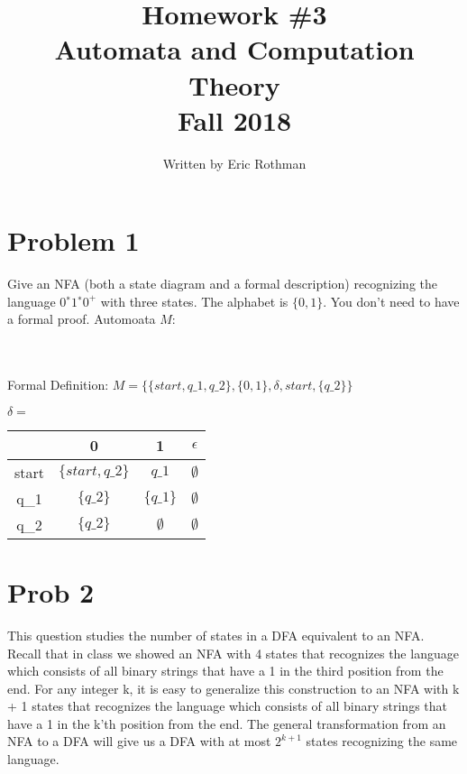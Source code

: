 \documentclass[letterpaper, 11pt]{article}
\begin{document}
\title{Homework \#3 \\ Automata and Computation Theory \\Fall 2018}
\author{Written by Eric Rothman}

\maketitle

\section{Problem 1}
 Give an NFA (both a state diagram and a formal description) recognizing the language $0^∗1^∗0^+$ with three states. The alphabet is $\{0, 1\}$. You don’t need to have a formal proof.
Automoata $M$:

\\\\
Formal Definition:
$M = \{\{start, q\_1, q\_2\}, \{0, 1\}, \delta, start, \{q\_2\}\}$

$\delta = $
\begin{tabular}{|c|c|c|c|}
  \hline
   & 0 & 1 & $\epsilon$\\
  \hline
  start & $\{start, q\_2\}$ & ${q\_1}$ & $\emptyset$\\
  \hline
  q\_1 & $\{q\_2\}$ & $\{q\_1\}$ & $\emptyset$\\
  \hline
  q\_2 & $\{q\_2\}$ & $\emptyset$ & $\emptyset$\\
  \hline
\end{tabular}

\newpage
\section{Prob 2}

This question studies the number of states in a DFA equivalent to an NFA. Recall that
in class we showed an NFA with 4 states that recognizes the language which consists of all binary
strings that have a 1 in the third position from the end. For any integer k, it is easy to generalize this
construction to an NFA with k + 1 states that recognizes the language which consists of all binary
strings that have a 1 in the k’th position from the end. The general transformation from an NFA to a
DFA will give us a DFA with at most $2^{k+1}$ states recognizing the same language.
\end{document}
